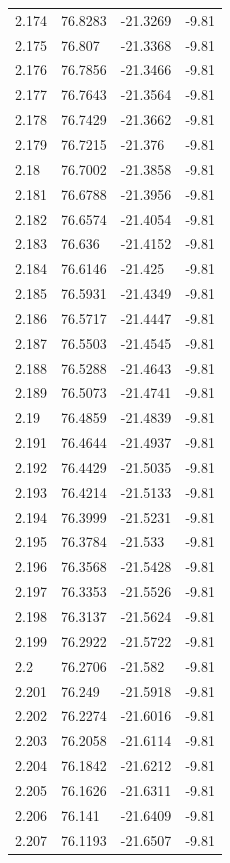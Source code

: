\begin{tabular}{llll}
2.174 & 76.8283 & -21.3269 & -9.81 \\
2.175 & 76.807 & -21.3368 & -9.81 \\
2.176 & 76.7856 & -21.3466 & -9.81 \\
2.177 & 76.7643 & -21.3564 & -9.81 \\
2.178 & 76.7429 & -21.3662 & -9.81 \\
2.179 & 76.7215 & -21.376 & -9.81 \\
2.18 & 76.7002 & -21.3858 & -9.81 \\
2.181 & 76.6788 & -21.3956 & -9.81 \\
2.182 & 76.6574 & -21.4054 & -9.81 \\
2.183 & 76.636 & -21.4152 & -9.81 \\
2.184 & 76.6146 & -21.425 & -9.81 \\
2.185 & 76.5931 & -21.4349 & -9.81 \\
2.186 & 76.5717 & -21.4447 & -9.81 \\
2.187 & 76.5503 & -21.4545 & -9.81 \\
2.188 & 76.5288 & -21.4643 & -9.81 \\
2.189 & 76.5073 & -21.4741 & -9.81 \\
2.19 & 76.4859 & -21.4839 & -9.81 \\
2.191 & 76.4644 & -21.4937 & -9.81 \\
2.192 & 76.4429 & -21.5035 & -9.81 \\
2.193 & 76.4214 & -21.5133 & -9.81 \\
2.194 & 76.3999 & -21.5231 & -9.81 \\
2.195 & 76.3784 & -21.533 & -9.81 \\
2.196 & 76.3568 & -21.5428 & -9.81 \\
2.197 & 76.3353 & -21.5526 & -9.81 \\
2.198 & 76.3137 & -21.5624 & -9.81 \\
2.199 & 76.2922 & -21.5722 & -9.81 \\
2.2 & 76.2706 & -21.582 & -9.81 \\
2.201 & 76.249 & -21.5918 & -9.81 \\
2.202 & 76.2274 & -21.6016 & -9.81 \\
2.203 & 76.2058 & -21.6114 & -9.81 \\
2.204 & 76.1842 & -21.6212 & -9.81 \\
2.205 & 76.1626 & -21.6311 & -9.81 \\
2.206 & 76.141 & -21.6409 & -9.81 \\
2.207 & 76.1193 & -21.6507 & -9.81 \\

\end{tabular}
